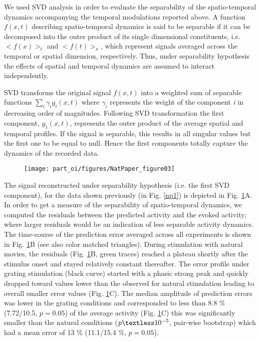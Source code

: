 \label{oi_separability}


We used SVD analysis in order to evaluate the separability of the
spatio-temporal dynamics accompanying the temporal modulations reported
above. A function $f(x,t)$ describing spatio-temporal dynamics is said to
be separable if it can be decomposed into \newpage the outer product of
its single dimensional constituents, i.e. $<f(x)>_{t}$ and $<f(t)>_{x}$,
which represent signals averaged across the temporal or spatial dimension,
respectively. Thus, under separability hypothesis the effects of spatial
and temporal dynamics are assumed to interact independently. 


SVD transforms the original signal $f(x,t)$ into a weighted sum of
separable functions $\sum_{i}\gamma_{i}g_{i}(x,t)$ where $\gamma_{i}$
represents the weight of the component \textit{i} in decreasing order of
magnitudes. Following SVD transformation the first component, $g_{1}(x,t)$,
represents the outer product of the average spatial and temporal profiles.
If the signal is separable, this results in all singular values but the
first one to be equal to null. Hence the first components totally capture
the dynamics of the recorded data. 

\begin{figure}[!t] \centerline{
\texttt{[image: part\_oi/figures/NatPaper\_figure03]}
} \caption[Separability of Spatio-Temporal Activity Dynamics.]
{ \protect} 
\label{np3}
\end{figure} 



The signal reconstructed under separability hypothesis (i.e. the first SVD
component), \newpage for the data shown previously (in Fig. \ref{np1}) is
depicted in Fig. \ref{np3}A. In order to get a measure of the separability
of spatio-temporal dynamics, we computed the residuals between the
predicted activity and the evoked activity; where larger residuals would be
an indication of less separable activity dynamics. The time-course of the
prediction error averaged across all experiments is shown in Fig.
\ref{np3}B (see also color matched triangles). During stimulation with
natural movies, the residuals (Fig. \ref{np3}B, green traces) reached a
plateau shortly after the stimulus onset and stayed relatively constant
thereafter. The error profile under grating stimulation (black curve)
started with a phasic strong peak and quickly dropped toward values lower
than the observed for natural stimulation leading to overall smaller error
values (Fig. \ref{np3}C). The median amplitude of prediction errors was
lower in the grating conditions and corresponded to less than 8.8 \%
(7.72/10.5, $p = 0.05$) of the average activity (Fig. \ref{np3}C) this was
significantly smaller than the natural conditions ($p \textless 10^{-5}$,
pair-wise bootstrap) which had a mean error of 13 \% (11.1/15.4 \%, $p =
0.05$). 

